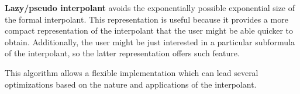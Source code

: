 \textbf{Lazy/pseudo interpolant} avoids the 
exponentially possible exponential size of the 
formal interpolant. This representation 
is useful because it provides a more compact
representation of the interpolant that the user 
might be able quicker to obtain.
Additionally, the user might be just 
interested in a particular subformula of 
the interpolant, so the
latter representation offers such feature.

This algorithm allows a flexible implementation 
which can lead several optimizations
based on the nature and applications of the 
interpolant.

